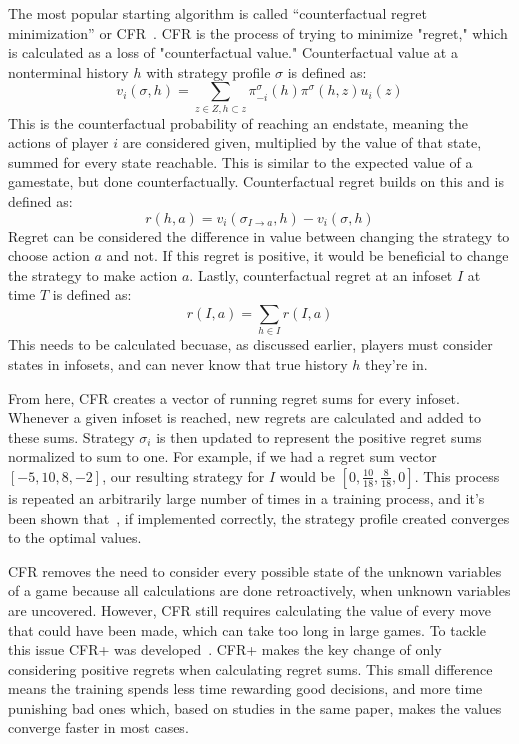 \documentclass[12pt, letterpaper]{article}
\begin{document}
The most popular starting algorithm is called “counterfactual regret minimization” or CFR~\cite{cfr-intro}. CFR is the process 
of trying to minimize "regret," which is calculated as a loss of "counterfactual value."
Counterfactual value at a nonterminal history $h$ with strategy profile $\sigma$ is defined as:
\begin{equation}
  v_i(\sigma, h) = \sum_{z \in Z, h \subset z} \pi^{\sigma}_{-i}(h)\pi^{\sigma}(h, z)u_{i}(z)
\end{equation}
This is the counterfactual probability of reaching an endstate, meaning the actions of player $i$ are considered given,
multiplied by the value of that state, summed for every state reachable. This is similar to the expected value of a
gamestate, but done counterfactually. Counterfactual regret builds on this and is defined as:
\begin{equation}
  r(h, a) = v_{i}(\sigma_{I \rightarrow a}, h) - v_{i}(\sigma, h)
\end{equation}
Regret can be considered the difference in value between changing the strategy to choose action $a$ and not.
If this regret is positive, it would be beneficial to change the strategy to make action $a$. Lastly,
counterfactual regret at an infoset $I$ at time $T$ is defined as:
\begin{equation}
  r(I, a) = \sum_{h \in I} r(I, a)
\end{equation}
This needs to be calculated becuase, as discussed earlier, players must consider states in infosets,
and can never know that true history $h$ they're in.

From here, CFR creates a vector of running regret sums for every infoset. Whenever a given infoset is reached, new regrets are calculated and added to these sums. Strategy $\sigma_{i}$ is then updated
to represent the positive regret sums normalized to sum to one. For example, if we had a regret sum vector
$[-5, 10, 8, -2]$, our resulting strategy for $I$ would be $[0, \frac{10}{18}, \frac{8}{18}, 0]$.
This process is repeated an arbitrarily large number of times in a
training process, and it's been shown that~\cite{regret-min-incomplete-information}, if implemented correctly, the strategy profile created
converges to the optimal values.

CFR removes the need to consider every possible state of the unknown variables of a
game because all calculations are done retroactively, when unknown variables are uncovered.
However, CFR still requires calculating the value of every move that could have been
made, which can take too long in large games. To tackle this issue
CFR+ was developed~\cite{cfr-plus}. CFR+ makes the key change of only considering positive regrets when
calculating regret sums. This small difference means the training spends less time rewarding
good decisions, and more time punishing bad ones which, based on studies in the same paper, makes the values
converge faster in most cases.
\end{document}
